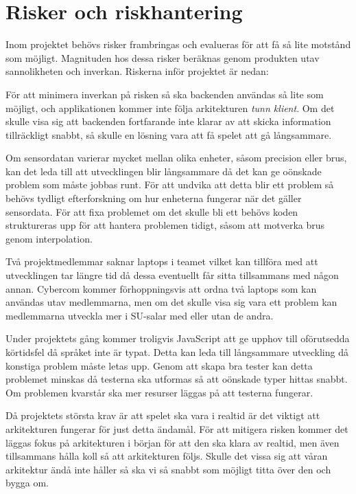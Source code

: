 \section{Risker och riskhantering}
Inom projektet behövs risker frambringas och evalueras för att få så lite motstånd som möjligt. 
Magnituden hos dessa risker beräknas genom produkten utav sannolikheten och inverkan.
Riskerna inför projektet är nedan:

{
    För att minimera inverkan på risken så ska backenden användas så lite som möjligt, och applikationen kommer inte följa arkitekturen \textit{tunn klient}.
    Om det skulle visa sig att backenden fortfarande inte klarar av att skicka information tillräckligt snabbt, 
    så skulle en lösning vara att få spelet att gå långsammare.
}

{
    Om sensordatan varierar mycket mellan olika enheter, såsom precision eller brus,
    kan det leda till att utvecklingen blir långsammare då det kan ge oönskade problem som måste jobbas runt.
    För att undvika att detta blir ett problem så behövs tydligt efterforskning om hur enheterna fungerar när
    det gäller sensordata. För att fixa problemet om det skulle bli ett behövs koden struktureras upp för att
    hantera problemen tidigt, såsom att motverka brus genom interpolation.
}

{
    Två projektmedlemmar saknar laptops i teamet vilket kan tillföra med att utvecklingen tar längre tid
    då dessa eventuellt får sitta tillsammans med någon annan.
    Cybercom kommer förhoppningsvis att ordna två laptops som kan användas utav medlemmarna, men om det skulle
    visa sig vara ett problem kan medlemmarna utveckla mer i SU-salar med eller utan de andra.
}

{
    Under projektets gång kommer troligvis JavaScript att ge upphov till oförutsedda körtidsfel då språket inte är typat.
    Detta kan leda till långsammare utveckling då konstiga problem måste letas upp.
    Genom att skapa bra tester kan detta problemet minskas då testerna ska utformas så att oönskade typer hittas snabbt.
    Om problemen kvarstår ska mer resurser läggas på att testerna fungerar.
}

{
    Då projektets största krav är att spelet ska vara i realtid är det viktigt att arkitekturen fungerar för just
    detta ändamål.
    För att mitigera risken kommer det läggas fokus på arkitekturen i början för att den ska klara av realtid, 
    men även tillsammans hålla koll så att arkitekturen följs.
    Skulle det vissa sig att våran arkitektur ändå inte håller så ska vi så snabbt som möjligt titta över den och bygga om.
}


